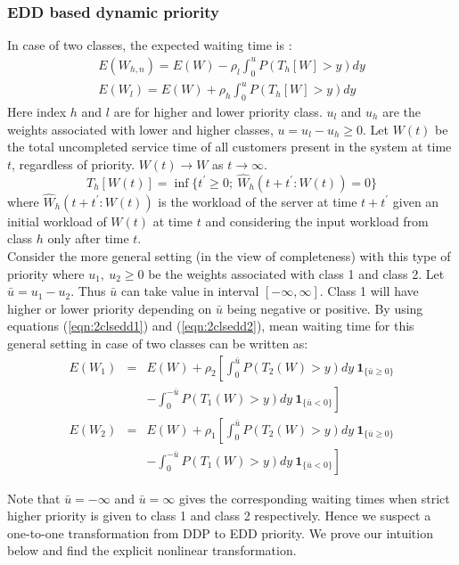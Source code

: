\documentclass[letterpaper, 10 pt, conference]{ieeeconf}  %
\begin{document}
\subsubsection{\textbf{EDD based dynamic priority}}
In case of two classes, the expected waiting time is \cite[Theorem 2]{EDDpriority}:
\begin{eqnarray}\label{eqn:2clsedd1}
E(W_{h,n}) = E(W) - \rho_l \int_0^u P(T_h[W] > y)dy\\
E(W_l) = E(W) + \rho_h \int_0^u P(T_h[W] > y)dy\label{eqn:2clsedd2}
\end{eqnarray}
Here index $h$ and $l$ are for higher and lower priority class. $u_l$ and $u_h$ are the weights associated with lower and higher classes, $u = u_l - u_h \geq 0$. Let $W(t)$ be the total uncompleted service time of all customers present in the system at time $t$, regardless of priority. $W(t) \rightarrow W$ as $t \rightarrow \infty $.
$$T_h[W(t)] = \inf\{t^{'} \geq  0 ;~ \hat{W}_h(t+t^{'}: W(t)) = 0\}$$
where $\hat{W}_h(t+t^{'}: W(t))$ is the workload of the server at time $t+t^{'}$ given an initial workload of $W(t)$ at time $t$ and considering the input workload from class $h$ only after time $t$.\\
\indent Consider the more general setting (in the view of completeness) with this type of priority where $u_1,~ u_2 \geq 0$ be the weights associated with class 1 and class 2. Let $\bar{u} = u_1 - u_2$. Thus $\bar{u}$ can take value in interval $[ -\infty, \infty]$. Class 1 will have higher or lower priority depending on $\bar{u}$ being negative or positive. By using equations (\ref{eqn:2clsedd1}) and (\ref{eqn:2clsedd2}), mean waiting time for this general setting in case of two classes can be written as:
 \begin{eqnarray}\label{eqn:EDDcombined1}\nonumber
 E(W_1) &=& E(W) + \rho_2\left[\int_0^{\bar{u}}P(T_2(W) > y)dy ~\mathbf{1}_{\{\bar{u} \geq 0\}}\right.\\
 && \left.-\int_0^{-\bar{u}}P(T_1(W) > y)dy ~\mathbf{1}_{\{\bar{u} < 0\}} \right]\\\nonumber
  E(W_2) &=& E(W) + \rho_1\left[\int_0^{\bar{u}}P(T_2(W) > y)dy ~\mathbf{1}_{\{\bar{u} \geq 0\}}\right.\\
  && \left. -\int_0^{-\bar{u}}P(T_1(W) > y)dy ~\mathbf{1}_{\{\bar{u} < 0\}} \right]\label{eqn:EDDcombined2}
 \end{eqnarray}
 
  Note that $\bar{u} = -\infty $ and $\bar{u} = \infty$ gives the corresponding waiting times when strict higher priority is given to class 1 and class 2 respectively. Hence we suspect a one-to-one transformation from DDP to EDD priority. We prove our intuition below and find the explicit nonlinear transformation.
\end{document}
